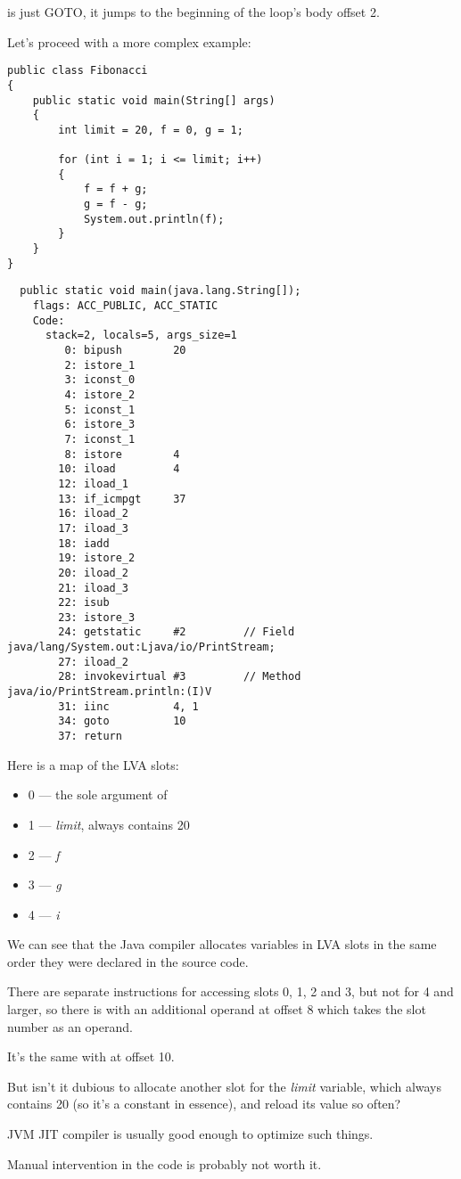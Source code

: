  is just GOTO, it jumps to the beginning of the loop's body offset 2.


Let's proceed with a more complex example:


\begin{lstlisting}[style=customjava]
public class Fibonacci
{
	public static void main(String[] args)
	{ 
		int limit = 20, f = 0, g = 1;

		for (int i = 1; i <= limit; i++)
		{
			f = f + g;
			g = f - g;
			System.out.println(f); 
		}
	}
}
\end{lstlisting}

\begin{lstlisting}
  public static void main(java.lang.String[]);
    flags: ACC_PUBLIC, ACC_STATIC
    Code:
      stack=2, locals=5, args_size=1
         0: bipush        20
         2: istore_1      
         3: iconst_0      
         4: istore_2      
         5: iconst_1      
         6: istore_3      
         7: iconst_1      
         8: istore        4
        10: iload         4
        12: iload_1       
        13: if_icmpgt     37
        16: iload_2       
        17: iload_3       
        18: iadd          
        19: istore_2      
        20: iload_2       
        21: iload_3       
        22: isub          
        23: istore_3      
        24: getstatic     #2         // Field java/lang/System.out:Ljava/io/PrintStream;
        27: iload_2       
        28: invokevirtual #3         // Method java/io/PrintStream.println:(I)V
        31: iinc          4, 1
        34: goto          10
        37: return        
\end{lstlisting}
        
Here is a map of the \ac{LVA} slots:


\begin{itemize}
\item 0 --- the sole argument of \main
\item 1 --- \emph{limit}, always contains 20
\item 2 --- \emph{f}
\item 3 --- \emph{g}
\item 4 --- \emph{i}
\end{itemize}

We can see that the Java compiler allocates variables in \ac{LVA} slots in the same order 
they were declared in the source code.


There are separate  instructions for accessing slots 0, 1, 2 and 3, 
but not for 4 and larger, so there is  with an additional operand at offset 8 
which takes the slot number as an operand.

It's the same with  at offset 10.


But isn't it dubious to allocate another slot for the \emph{limit} variable, which 
always contains 20 (so it's a constant in essence), and reload its value so often?

\ac{JVM} \ac{JIT} compiler is usually good enough to optimize such things.

Manual intervention in the code is probably not worth it.


